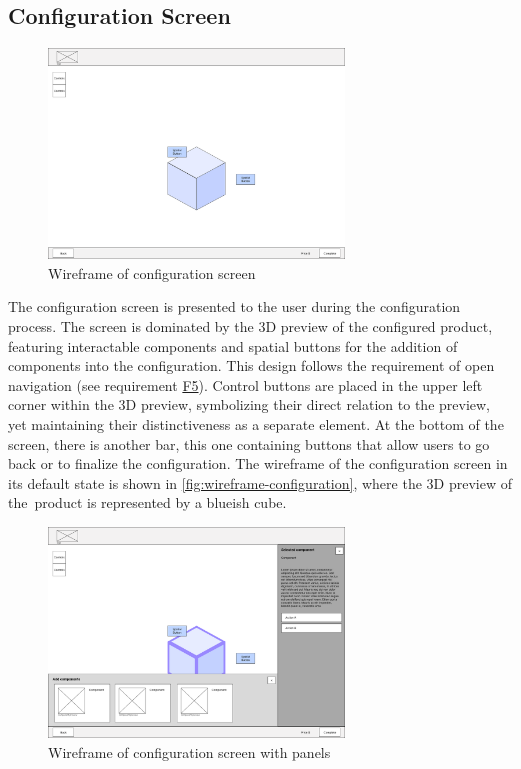 \subsection{Configuration Screen}

\begin{figure}[h]
\centering
\includegraphics[width=0.7\textwidth]{images/wireframe_configuration_default.png}
\caption{Wireframe of configuration screen}
\label{fig:wireframe-configuration}
\end{figure}


The configuration screen is presented to the user during the configuration process. The screen is dominated by the 3D preview of the configured product, featuring interactable components and spatial buttons for the addition of components into the configuration. This design follows the requirement of open navigation (see requirement \hyperref[itm:F5]{F5}). Control buttons are placed in the upper left corner within the 3D preview, symbolizing their direct relation to the preview, yet maintaining their distinctiveness as a separate element. At the bottom of the screen, there is another bar, this one containing buttons that allow users to go back or to finalize the configuration. The wireframe of the configuration screen in its default state is shown in \autoref{fig:wireframe-configuration}, where the 3D preview of the~product is represented by a blueish cube.

\begin{figure}[h]
\centering
\includegraphics[width=0.7\textwidth]{images/wireframe_configuration_panels.png}
\caption{Wireframe of configuration screen with panels}
\label{fig:wireframe-configuration-panels}
\end{figure}

